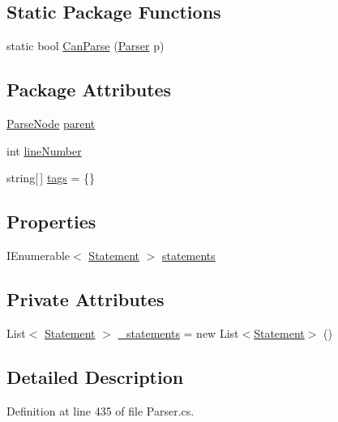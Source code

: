 \subsection*{Static Package Functions}
\begin{DoxyCompactItemize}
\item 
static bool \hyperlink{a00033_a7fa97243e2a807c2255988547d31cac7}{Can\-Parse} (\hyperlink{a00139}{Parser} p)
\end{DoxyCompactItemize}
\subsection*{Package Attributes}
\begin{DoxyCompactItemize}
\item 
\hyperlink{a00138}{Parse\-Node} \hyperlink{a00138_af313a82103fcc2ff5a177dbb06b92f7b}{parent}
\item 
int \hyperlink{a00138_a18b493382de0fde5b4299c1bd2250075}{line\-Number}
\item 
string\mbox{[}$\,$\mbox{]} \hyperlink{a00138_a58b3a15788fd2d4127d73619dc6d04ae}{tags} = \{\}
\end{DoxyCompactItemize}
\subsection*{Properties}
\begin{DoxyCompactItemize}
\item 
I\-Enumerable$<$ \hyperlink{a00156}{Statement} $>$ \hyperlink{a00033_a42e3d555bbd5ecbdf61c45ad715be7e1}{statements}
\end{DoxyCompactItemize}
\subsection*{Private Attributes}
\begin{DoxyCompactItemize}
\item 
List$<$ \hyperlink{a00156}{Statement} $>$ \hyperlink{a00033_ad79f9582e55ec75b68fd72ffcae0f41b}{\-\_\-statements} = new List$<$\hyperlink{a00156}{Statement}$>$ ()
\end{DoxyCompactItemize}


\subsection{Detailed Description}


Definition at line 435 of file Parser.\-cs.



